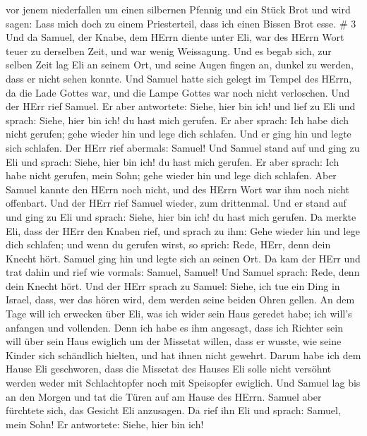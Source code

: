 vor jenem niederfallen um einen silbernen Pfennig und ein Stück Brot und
wird sagen: Lass mich doch zu einem Priesterteil, dass ich einen Bissen
Brot esse. \# 3  Und da Samuel, der Knabe, dem HErrn diente
unter Eli, war des HErrn Wort teuer zu derselben Zeit, und war wenig
Weissagung.  Und es begab sich, zur selben Zeit lag Eli an
seinem Ort, und seine Augen fingen an, dunkel zu werden, dass er nicht
sehen konnte.  Und Samuel hatte sich gelegt im Tempel des
HErrn, da die Lade Gottes war, und die Lampe Gottes war noch nicht
verloschen.  Und der HErr rief Samuel. Er aber antwortete:
Siehe, hier bin ich!  und lief zu Eli und sprach: Siehe,
hier bin ich! du hast mich gerufen. Er aber sprach: Ich habe dich nicht
gerufen; gehe wieder hin und lege dich schlafen. Und er ging hin und
legte sich schlafen.  Der HErr rief abermals: Samuel! Und
Samuel stand auf und ging zu Eli und sprach: Siehe, hier bin ich! du
hast mich gerufen. Er aber sprach: Ich habe nicht gerufen, mein Sohn;
gehe wieder hin und lege dich schlafen.  Aber Samuel kannte
den HErrn noch nicht, und des HErrn Wort war ihm noch nicht offenbart.
 Und der HErr rief Samuel wieder, zum drittenmal. Und er
stand auf und ging zu Eli und sprach: Siehe, hier bin ich! du hast mich
gerufen. Da merkte Eli, dass der HErr den Knaben rief,  und
sprach zu ihm: Gehe wieder hin und lege dich schlafen; und wenn du
gerufen wirst, so sprich: Rede, HErr, denn dein Knecht hört. Samuel ging
hin und legte sich an seinen Ort.  Da kam der HErr und trat
dahin und rief wie vormals: Samuel, Samuel! Und Samuel sprach: Rede,
denn dein Knecht hört.  Und der HErr sprach zu Samuel:
Siehe, ich tue ein Ding in Israel, dass, wer das hören wird, dem werden
seine beiden Ohren gellen.  An dem Tage will ich erwecken
über Eli, was ich wider sein Haus geredet habe; ich will's anfangen und
vollenden.  Denn ich habe es ihm angesagt, dass ich Richter
sein will über sein Haus ewiglich um der Missetat willen, dass er
wusste, wie seine Kinder sich schändlich hielten, und hat ihnen nicht
gewehrt.  Darum habe ich dem Hause Eli geschworen, dass die
Missetat des Hauses Eli solle nicht versöhnt werden weder mit
Schlachtopfer noch mit Speisopfer ewiglich.  Und Samuel lag
bis an den Morgen und tat die Türen auf am Hause des HErrn. Samuel aber
fürchtete sich, das Gesicht Eli anzusagen.  Da rief ihn Eli
und sprach: Samuel, mein Sohn! Er antwortete: Siehe, hier bin ich!
